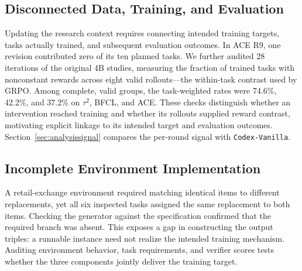 \subsection{Disconnected Data, Training, and Evaluation}
\label{sec:feedbackgap}

Updating the research context requires connecting intended training targets,
tasks actually trained, and subsequent evaluation outcomes. In ACE R9, one
revision contributed zero of its ten planned tasks. We further
audited 28 iterations of the original 4B studies, measuring the fraction of
trained tasks with nonconstant rewards across eight valid rollouts---the
within-task contrast used by GRPO. Among complete, valid groups, the
task-weighted rates were 74.6\%, 42.2\%, and 37.2\% on $\tau^2$, BFCL,
and ACE. These checks distinguish
whether an intervention reached training and whether its rollouts supplied
reward contrast, motivating explicit linkage to its intended target and
evaluation outcomes.
Section~\ref{sec:analysissignal} compares the per-round signal with
\texttt{Codex-Vanilla}.

\subsection{Incomplete Environment Implementation}
\label{sec:implementationgap}

A retail-exchange environment required matching identical items to different
replacements, yet all six inspected tasks assigned the same replacement to
both items. Checking the generator against the specification confirmed that
the required branch was absent.
This exposes a gap in constructing the output triples: a runnable instance
need not realize the intended training mechanism. Auditing environment
behavior, task requirements, and verifier scores tests whether the three
components jointly deliver the training target.
